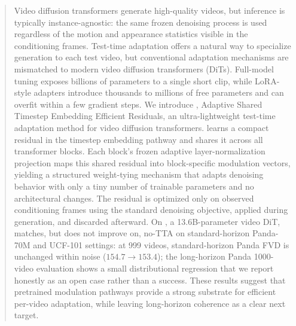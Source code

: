 \begin{abstract}
Video diffusion transformers generate high-quality videos, but inference is
typically instance-agnostic: the same frozen denoising process is used regardless
of the motion and appearance statistics visible in the conditioning frames.
Test-time adaptation offers a natural way to specialize generation to each test
video, but conventional adaptation mechanisms are mismatched to modern video
diffusion transformers (DiTs). Full-model tuning exposes billions of parameters
to a single short clip, while LoRA-style adapters introduce thousands to millions
of free parameters and can overfit within a few gradient steps.
We introduce \method, Adaptive Shared Timestep Embedding Efficient Residuals,
an ultra-lightweight test-time adaptation method for video diffusion
transformers. \method learns a compact residual in the timestep embedding
pathway and shares it across all transformer blocks. Each block's frozen
adaptive layer-normalization projection maps this shared residual into
block-specific modulation vectors, yielding a structured weight-tying mechanism
that adapts denoising behavior with only a tiny number of trainable parameters
and no architectural changes. The residual is optimized only on observed
conditioning frames using the standard denoising objective, applied during
generation, and discarded afterward.
On \backbone, a 13.6B-parameter video DiT, \method matches, but does not
improve on, no-TTA on standard-horizon Panda-70M and UCF-101 settings: at
999 videos, standard-horizon Panda FVD is unchanged within noise
($154.7\to153.4$); the long-horizon Panda
1000-video evaluation shows a small distributional regression that we report
honestly as an open case rather than a success. These results suggest that
pretrained modulation pathways provide a strong substrate for efficient
per-video adaptation, while leaving long-horizon coherence as a clear next
target.
\end{abstract}
